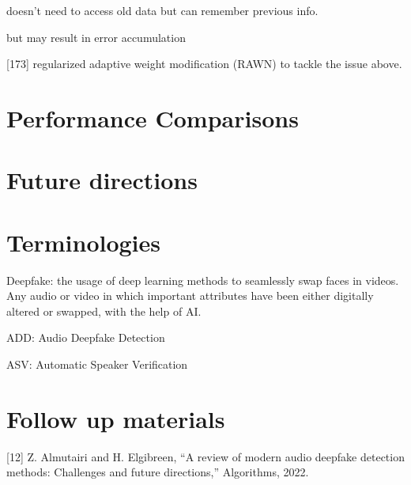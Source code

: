 \documentclass{article}
\begin{document}
doesn't need to access old data but can remember previous info. 

but may result in error accumulation

[173] regularized adaptive weight modification (RAWN) to tackle the issue above. 

\section{Performance Comparisons}

\section{Future directions}


\section{Terminologies}
Deepfake: the usage of deep learning methods to seamlessly swap faces in videos. Any audio or video in which important attributes have been either digitally altered or swapped, with the help of AI. 

ADD: Audio Deepfake Detection

ASV: Automatic Speaker Verification



\section{Follow up materials}
[12] Z. Almutairi and H. Elgibreen, “A review of modern audio deepfake detection methods: Challenges and future directions,” Algorithms, 2022. 
\end{document}
